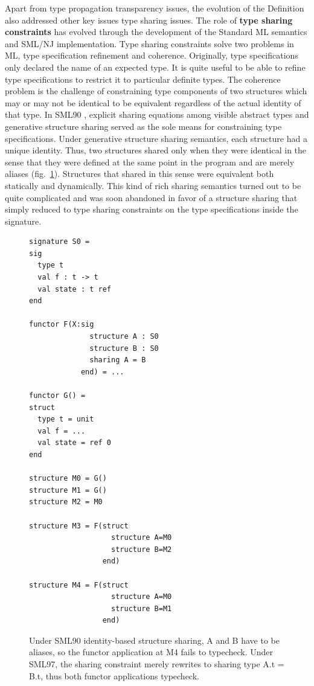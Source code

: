 \documentclass[12pt]{article}
\begin{document}

Apart from type propagation transparency issues, the evolution of the Definition also addressed other key issues type sharing issues. The role of {\bf type sharing constraints} has evolved through the development of the Standard ML semantics and SML/NJ implementation. Type sharing constraints solve two problems in ML, type specification refinement and coherence. Originally, type specifications only declared the name of an expected type. It is quite useful to be able to refine type specifications to restrict it to particular definite types. The coherence problem is the challenge of constraining type components of two structures which may or may not be identical to be equivalent regardless of the actual identity of that type. In SML90 \cite{mth90}, explicit sharing equations among visible abstract types and generative structure sharing served as the sole means for constraining type specifications. Under generative structure sharing semantics, each structure had a unique identity. Thus, two structures shared only when they were identical in the sense that they were defined at the same point in the program and are merely aliases (fig.~\ref{fig:structuresharing}). Structures that shared in this sense were equivalent both statically and dynamically. This kind of rich sharing semantics turned out to be quite complicated and was soon abandoned in favor of a structure sharing that simply reduced to type sharing constraints on the type specifications inside the signature. 

\begin{figure}
\begin{lstlisting}
signature S0 = 
sig 
  type t
  val f : t -> t
  val state : t ref
end

functor F(X:sig 
              structure A : S0
              structure B : S0
              sharing A = B
            end) = ...

functor G() = 
struct
  type t = unit
  val f = ...
  val state = ref 0
end

structure M0 = G()
structure M1 = G()
structure M2 = M0

structure M3 = F(struct 
                   structure A=M0
                   structure B=M2
                 end)

structure M4 = F(struct
                   structure A=M0
                   structure B=M1
                 end)
\end{lstlisting}
\caption{Under SML90 identity-based structure sharing, A and B have to be aliases, so the functor application at M4 fails to typecheck. Under SML97, the sharing constraint merely rewrites to sharing type A.t = B.t, thus both functor applications typecheck. }
\label{fig:structuresharing}
\end{figure}
\end{document}
